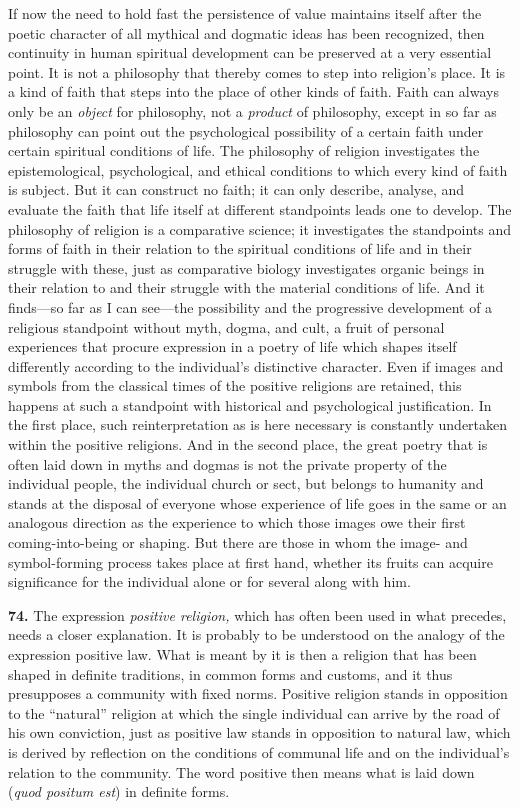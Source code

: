 \documentclass[12pt,a4paper]{book}
\newcommand{\opage}[1]{\marginnote{\footnotesize\textit{[#1]}}}
\begin{document}
If now the need to hold fast the persistence of value maintains itself after the poetic character of
all mythical and dogmatic ideas has been recognized, then continuity in human spiritual development
can be preserved at a very essential point. It is not a philosophy that thereby comes to step into
religion's place. It is a kind of faith that steps into the place of other kinds of faith. Faith can
always only be an \emph{object} for philosophy, not a \emph{product} of philosophy, except in so far
as philosophy can point out the psychological possibility of a certain faith under certain spiritual
conditions of life. The philosophy of religion investigates the epistemological, psychological, and
ethical conditions to which every kind of faith is subject. But it can construct no faith; it can
only describe, analyse, and evaluate the faith that life itself at different standpoints leads one to
develop. The philosophy of religion is a comparative science; it investigates the standpoints and
forms of faith in their relation to the spiritual conditions of life and in their struggle with
these, just as comparative biology investigates organic beings in their relation to and their struggle
with the material conditions of life. And it finds---so far as I can see---the possibility and the
progressive development of a religious standpoint without myth, dogma, and cult, a fruit of personal
experiences that procure expression in a poetry of life which shapes itself differently according to
the individual's distinctive character. Even if images and 
\opage{171}symbols from the classical times of the
positive religions are retained, this happens at such a standpoint with historical and psychological
justification. In the first place, such reinterpretation as is here necessary is constantly undertaken
within the positive religions. And in the second place, the great poetry that is often laid down in
myths and dogmas is not the private property of the individual people, the individual church or sect,
but belongs to humanity and stands at the disposal of everyone whose experience of life goes in the
same or an analogous direction as the experience to which those images owe their first
coming-into-being or shaping. But there are those in whom the image- and symbol-forming process takes
place at first hand, whether its fruits can acquire significance for the individual alone or for
several along with him.

\medskip

\noindent\textbf{74.} The expression \emph{positive religion,} which has often been used in what
precedes, needs a closer explanation. It is probably to be understood on the analogy of the expression
positive law. What is meant by it is then a religion that has been shaped in definite traditions, in
common forms and customs, and it thus presupposes a community with fixed norms. Positive religion
stands in opposition to the ``natural'' religion at which the single individual can arrive by the road
of his own conviction, just as positive law stands in opposition to natural law, which is derived by
reflection on the conditions of communal life and on the individual's relation to the community. The
word positive then means what is laid down (\textit{quod positum est}) in definite forms.
\end{document}
